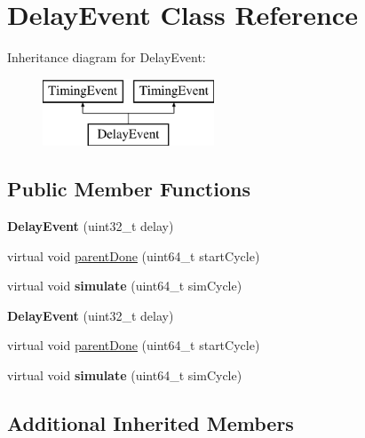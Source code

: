 \hypertarget{classDelayEvent}{\section{Delay\-Event Class Reference}
\label{classDelayEvent}
}
Inheritance diagram for Delay\-Event\-:\begin{figure}[H]
\begin{center}
\leavevmode
\includegraphics[height=2.000000cm]{classDelayEvent}
\end{center}
\end{figure}
\subsection*{Public Member Functions}
\begin{DoxyCompactItemize}
\item 
\hypertarget{classDelayEvent_a32bb27c084add7841c78f901efe2f74d}{{\bfseries Delay\-Event} (uint32\-\_\-t delay)}\label{classDelayEvent_a32bb27c084add7841c78f901efe2f74d}

\item 
virtual void \hyperlink{classDelayEvent_aa1a9ef6d5dc0d8c74f6e2c52d217ef73}{parent\-Done} (uint64\-\_\-t start\-Cycle)
\item 
\hypertarget{classDelayEvent_a9c9f03ccb0199158ed88836b618b6359}{virtual void {\bfseries simulate} (uint64\-\_\-t sim\-Cycle)}\label{classDelayEvent_a9c9f03ccb0199158ed88836b618b6359}

\item 
\hypertarget{classDelayEvent_a32bb27c084add7841c78f901efe2f74d}{{\bfseries Delay\-Event} (uint32\-\_\-t delay)}\label{classDelayEvent_a32bb27c084add7841c78f901efe2f74d}

\item 
virtual void \hyperlink{classDelayEvent_aa1a9ef6d5dc0d8c74f6e2c52d217ef73}{parent\-Done} (uint64\-\_\-t start\-Cycle)
\item 
\hypertarget{classDelayEvent_a9c9f03ccb0199158ed88836b618b6359}{virtual void {\bfseries simulate} (uint64\-\_\-t sim\-Cycle)}\label{classDelayEvent_a9c9f03ccb0199158ed88836b618b6359}

\end{DoxyCompactItemize}
\subsection*{Additional Inherited Members}



